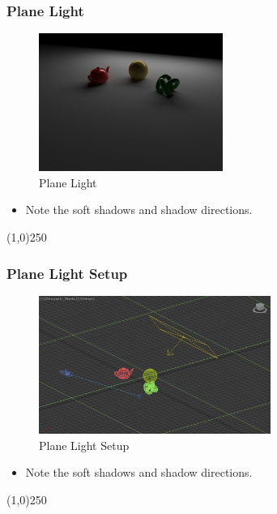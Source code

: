 \begin{frame}
	\frametitle{Plane Light}
	\begin{figure}
		\centering
		\includegraphics[height=4.5cm]{./Lights/PlaneLight}
		\caption{Plane Light}
		\label{fig:PlaneLight}
	\end{figure}
	\begin{itemize}
		\item Note the soft shadows and shadow directions.
	\end{itemize}
\end{frame}
\begin{center}\line(1,0){250}\end{center}


\begin{frame}
	\frametitle{Plane Light Setup}
	\begin{figure}
		\centering
		\includegraphics[height=4.5cm]{./Lights/PlaneLightSetup}
		\caption{Plane Light Setup}
		\label{fig:PlaneLightSetup}
	\end{figure}
	\begin{itemize}
		\item Note the soft shadows and shadow directions.
	\end{itemize}
\end{frame}
\begin{center}\line(1,0){250}\end{center}





